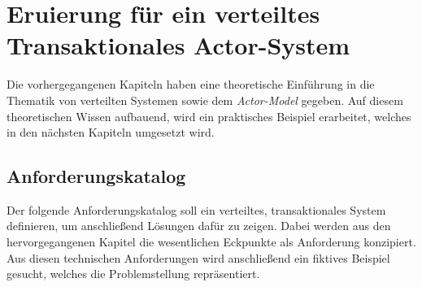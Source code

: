 \chapter{Eruierung für ein verteiltes Transaktionales Actor-System} 
\label{cha:Eruierung}
Die vorhergegangenen Kapiteln haben eine theoretische Einführung in die Thematik von verteilten Systemen sowie dem \textit{Actor-Model} gegeben. Auf diesem theoretischen Wissen aufbauend, wird ein praktisches Beispiel erarbeitet, welches in den nächsten Kapiteln umgesetzt wird. 

\section{Anforderungskatalog} \label{sec:Eruierung:technicalRequierements}
Der folgende Anforderungskatalog soll ein verteiltes, transaktionales System definieren, um anschließend Lösungen dafür zu zeigen. Dabei werden aus den hervorgegangenen Kapitel die wesentlichen Eckpunkte als Anforderung konzipiert. Aus diesen technischen Anforderungen wird anschließend ein fiktives Beispiel gesucht, welches die Problemstellung repräsentiert.

